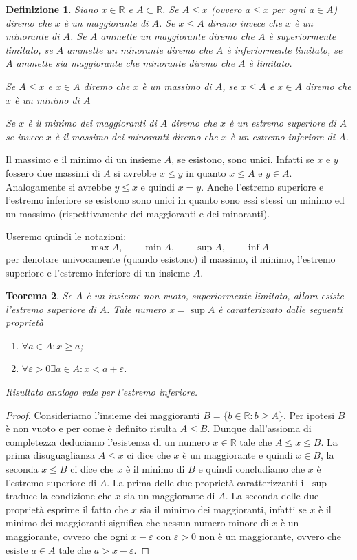 \documentclass[italian,a4paper,oneside,headinclude]{scrbook}
\newcommand{\eps}{\varepsilon}
\newcommand{\RR}{\mathbb R}
\newtheorem{theorem}{Teorema}
\newtheorem{definition}[theorem]{Definizione}
\begin{document}
\begin{definition}
Siano $x \in \RR$ e $A \subset \RR$. Se $A\le x$ (ovvero $a\le x$ per ogni $a\in A$)
diremo che $x$ è un \emph{maggiorante} di $A$.
Se $x \le A$ diremo invece che $x$ è un \emph{minorante} di $A$.
Se $A$ ammette un maggiorante diremo che $A$ è \emph{superiormente limitato},
se $A$ ammette un minorante diremo che $A$ è \emph{inferiormente limitato},
se $A$ ammette sia maggiorante che minorante diremo che $A$ è \emph{limitato}.

Se $A \le x$ e $x\in A$ diremo che $x$ è un massimo di $A$,
se $x\le A$ e $x\in A$ diremo che $x$ è un minimo di $A$

Se $x$ è il minimo dei maggioranti di $A$ diremo che $x$ è
un \emph{estremo superiore}
di $A$ se invece $x$ è il massimo dei minoranti diremo che $x$ è
un \emph{estremo inferiore} di $A$.
\end{definition}

Il massimo e il minimo di un insieme $A$, se esistono, sono unici.
Infatti se $x$ e $y$ fossero due massimi di $A$ si avrebbe $x\le y$ in
quanto $x\le A$ e $y\in A$. Analogamente si avrebbe $y\le x$ e
quindi $x=y$.
Anche l'estremo superiore e l'estremo inferiore se esistono sono
unici in quanto sono essi stessi un minimo ed un massimo
(rispettivamente dei maggioranti e dei minoranti).

Useremo quindi le notazioni:
\[
 \max A, \qquad
 \min A, \qquad
 \sup A, \qquad
 \inf A
\]
per denotare univocamente (quando esistono) il massimo, il minimo,
l'estremo superiore e l'estremo inferiore di un insieme $A$.

\begin{theorem}
Se $A$ è un insieme non vuoto,
superiormente limitato, allora esiste l'estremo superiore di $A$.
Tale numero $x=\sup A$ è caratterizzato dalle seguenti proprietà
\begin{enumerate}
\item $\forall a\in A\colon x \ge a$;
\item $\forall \eps>0 \exists a\in A \colon x < a + \eps$.
\end{enumerate}

Risultato analogo vale per l'estremo inferiore.
\end{theorem}
%
\begin{proof}
Consideriamo l'insieme dei maggioranti
$B = \{ b\in \RR \colon b \ge A\}$.
Per ipotesi $B$ è non vuoto e per come è definito risulta $A\le B$.
Dunque dall'assioma di completezza deduciamo l'esistenza di un numero $x\in \RR$
tale che $A\le x \le B$. La prima disuguaglianza $A\le x$ ci dice che $x$ è un
maggiorante e quindi $x\in B$, la seconda $x\le B$ ci dice che $x$ è il minimo
di $B$ e quindi concludiamo che $x$ è l'estremo superiore di $A$.
La prima delle due proprietà caratterizzanti il $\sup$ traduce la condizione
che $x$ sia un maggiorante di $A$. La seconda delle due proprietà esprime il
fatto che $x$ sia il minimo dei maggioranti, infatti se $x$ è il minimo
dei maggioranti significa che nessun numero minore di $x$ è un maggiorante, ovvero
che ogni $x-\eps$ con $\eps>0$ non è un maggiorante, ovvero
che esiste $a\in A$ tale che $a > x-\eps$.
\end{proof}
\end{document}
